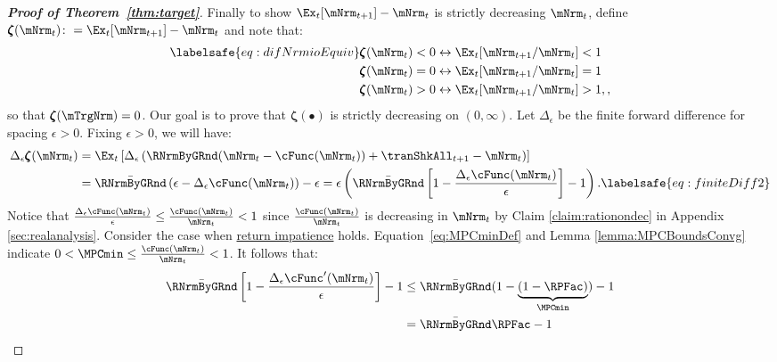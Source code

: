 \documentclass[\econtexRoot/BufferStockTheory]{subfiles}
\begin{document}
\begin{proof}[\textbf{Proof of Theorem~\ref{thm:target}}]
Finally to show $\Ex_t [{\mNrm}_{t+1}] -\mNrm_t$ is strictly decreasing $\mNrm_t$, define \providecommand{\difFunc}{\pmb{\zeta}} $\difFunc(\mNrm_t) \colon = 
\Ex_t[\mNrm_{t+1}] - \mNrm_t$ and note that:
%
\begin{align}\labelsafe{eq:difNrmioEquiv}
  \difFunc(\mNrm_t) < 0 &\leftrightarrow \Ex_t[{\mNrm}_{t+1}/\mNrm_t] < 1 
                          \nonumber\\
  \difFunc(\mNrm_t) = 0 &\leftrightarrow \Ex_t[{\mNrm}_{t+1}/\mNrm_t] = 1\\
  \difFunc(\mNrm_t) > 0 &\leftrightarrow \Ex_t[{\mNrm}_{t+1}/\mNrm_t] > 
                          1,\nonumber,
\end{align}
%
so that $\difFunc(\mTrgNrm)=0$.
Our goal is to prove that $\difFunc(\bullet)$ is strictly  decreasing on $(0,\infty)$. Let $\Delta_{\epsilon}$ be the finite forward difference for spacing $\epsilon>0$. Fixing $\epsilon>0$, we will have: 
%
\begin{align}
  \Delta_{\epsilon}\difFunc(\mNrm_{t}) & 			= \Ex_{t}\left[\Delta_{\epsilon} \left( {\RNrmByGRnd}(\mNrm_{t}-\cFunc(\mNrm_{t}))+%
                                                                       {\tranShkAll}_{t+1} - {\mNrm}_t\right) \right] \notag \\
                                                  & =  \bar{\RNrmByGRnd}\left( \epsilon-
                                                       \Delta_{\epsilon}\cFunc({\mNrm}_t)\right) - \epsilon = \epsilon\left( \bar{\RNrmByGRnd}\left[1-
                                                       \frac{\Delta_{\epsilon}\cFunc({\mNrm}_t)}{\epsilon}\right]- 1\right). \labelsafe{eq:finiteDiff2}
\end{align}
%
Notice  that $\frac{\Delta_{\epsilon}\cFunc({\mNrm}_t)}{\epsilon} \leq \frac{\cFunc(\mNrm_{t})}{\mNrm_{t}}<1$ since $\frac{\cFunc(\mNrm_{t})}{\mNrm_{t}}$ is decreasing in $\mNrm_{t}$ by Claim \ref{claim:rationondec} in Appendix \ref{sec:realanalysis}. Consider the case when \hyperlink{RIC}{return impatience} holds. Equation~\eqref{eq:MPCminDef} and Lemma \ref{lemma:MPCBoundsConvg} indicate $0 < \MPCmin \leq \frac{\cFunc(\mNrm_{t})}{\mNrm_{t}} < 1$.
%
It follows that:
%
\begin{align*}
  \bar{\RNrmByGRnd}\left[1-\frac{\Delta_{\epsilon}\cFunc^{\prime}({\mNrm}_t)}{\epsilon}\right]- 1 & \leq  \bar{\RNrmByGRnd}(1-\underbrace{(1-\RPFac)}_{\MPCmin}) - 1  \\
                                                            & = \bar{\RNrmByGRnd}\RPFac - 1 \\

\end{align*}
\end{proof}
\end{document}
